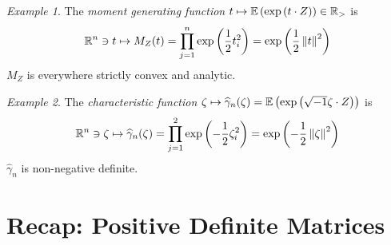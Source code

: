 \documentclass[12pt,a4paper]{amsart}
\theoremstyle{plain}%
\theoremstyle{definition}
\theoremstyle{remark}
\newtheorem{example}{Example}
\begin{document}
\begin{example} 
The \emph{moment generating function} $t \mapsto \operatorname{\mathbb E}\left(\exp\left(t\cdot Z\right)\right) \in \mathbb{R}_>$ is
%
\begin{equation*}
\mathbb{R}^n \ni t \mapsto M_Z(t) = \prod_{j=1}^n \exp\left(\frac12 t_i^2\right) = \exp\left(\frac12 \left\Vert t\right\Vert^2\right)
\end{equation*}
%
$M_Z$ is everywhere strictly convex and analytic.
\end{example}

\begin{example}
  The \emph{characteristic function} $\zeta \mapsto \widehat \gamma_n(\zeta) = \operatorname{\mathbb E}\left(\exp\left(\sqrt{-1} \zeta \cdot Z\right)\right)$ is
%
\begin{equation*}
  \mathbb{R}^n \ni \zeta \mapsto \widehat \gamma_n(\zeta) = \prod_{j=1}^2 \exp\left(-\frac12 \zeta_i^2\right) = \exp\left(-\frac12 \left\Vert\zeta\right\Vert ^2\right)
\end{equation*}
%
$\widehat \gamma_n$ is non-negative definite.
%
\end{example}

\section{Recap: Positive Definite Matrices}
\end{document}
